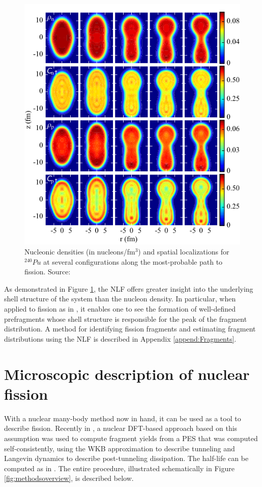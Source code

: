 \begin{figure}
	\centering
	\includegraphics[width=0.5\linewidth]{TeX_files/methods_locali}
	\caption[Nucleonic densities (in nucleons/fm$^3$) and spatial localizations for $^{240}Pu$]{Nucleonic densities (in nucleons/fm$^3$) and spatial localizations for $^{240}Pu$ at several configurations along the most-probable path to fission. Source: \cite{Zhang2016}}
	\label{fig:methodslocali}
\end{figure}

As demonstrated in Figure \ref{fig:methodslocali}, the NLF offers greater insight into the underlying shell structure of the system than the nucleon density. In particular, when applied to fission as in \cite{Sadhukhan2017}, it enables one to see the formation of well-defined prefragments whose shell structure is responsible for the peak of the fragment distribution. A method for identifying fission fragments and estimating fragment distributions using the NLF is described in Appendix \ref{append:Fragments}.


\section{Microscopic description of nuclear fission}
With a nuclear many-body method now in hand, it can be used as a tool to describe fission. Recently in \cite{Sadhukhan2016}, a nuclear DFT-based approach based on this assumption was used to compute fragment yields from a PES that was computed self-consistently, using the WKB approximation to describe tunneling and Langevin dynamics to describe post-tunneling dissipation. The half-life can be computed as in \cite{Sadhukhan2013}. The entire procedure, illustrated schematically in Figure \ref{fig:methodsoverview}, is described below.

